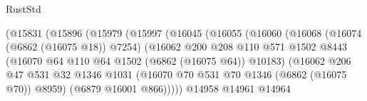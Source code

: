 \begin{lexlean}{RustStd}
\begin{coremodule}
                                        (@15831
                                          (@15896
                                            (@15979
                                              (@15997
                                                (@16045
                                                  (@16055
                                                    (@16060
                                                      (@16068
                                                        (@16074 (@6862 (@16075 @18)) @7254)
                                                        (@16062
                                                          @200
                                                          @208
                                                          @110
                                                          @571
                                                          @1502
                                                          @8443
                                                          (@16070
                                                            @64
                                                            @110
                                                            @64
                                                            @1502
                                                            (@6862 (@16075 @64))
                                                            @10183)
                                                          (@16062
                                                            @206
                                                            @47
                                                            @531
                                                            @32
                                                            @1346
                                                            @1031
                                                            (@16070
                                                              @70
                                                              @531
                                                              @70
                                                              @1346
                                                              (@6862 (@16075 @70))
                                                              @8959)
                                                            (@6879 @16001 @866)))))
                                                    @14958
                                                    @14961
                                                    @14964

\end{coremodule}
\end{lexlean}
